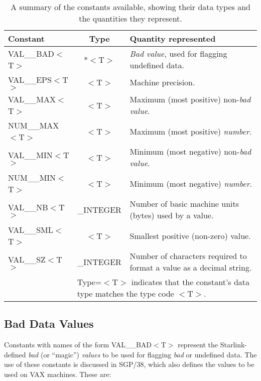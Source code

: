 \documentclass[11pt,nolof]{starlink}
\providecommand{\name}[1]{#1}
\begin{document}
\begin{table}
\begin{center}
\begin{tabular}{|l|c|p{25em}|}
\hline
\textbf{Constant} & \textbf{Type} & \textbf{Quantity represented} \\
\hline
VAL\_\_BAD$<$T$>$ & *$<$T$>$ & \emph{Bad value}, used for flagging undefined
data.
\\
VAL\_\_EPS$<$T$>$ & $<$T$>$ & Machine precision.
\\
VAL\_\_MAX$<$T$>$ & $<$T$>$ & Maximum (most positive) non-\emph{bad value}.
\\
NUM\_\_MAX$<$T$>$ & $<$T$>$ & Maximum (most positive) \emph{number}.
\\
VAL\_\_MIN$<$T$>$ & $<$T$>$ & Minimum (most negative) non-\emph{bad value}.
\\
NUM\_\_MIN$<$T$>$ & $<$T$>$ & Minimum (most negative) \emph{number}.
\\
VAL\_\_NB$<$T$>$ & \_INTEGER & Number of basic machine units (bytes) used
by a value.
\\
VAL\_\_SML$<$T$>$ & $<$T$>$ & Smallest positive (non-zero) value.
\\
VAL\_\_SZ$<$T$>$ & \_INTEGER & Number of characters required to format a
value as a decimal string.
\\
\hline
\multicolumn{1}{|c}{} &
\multicolumn{2}{l|}{\footnotesize *Type=$<$T$>$ indicates that the
constant's data type matches the type code $<$T$>$.} \\
\hline
\end{tabular}
\caption{A summary of the constants available, showing their data types and
the quantities they represent.}
\label{table:constants}
\end{center}
\end{table}

\subsection{Bad Data Values}
\label{section:badconstants}

Constants with names of the form \name{VAL\_\_BAD$<$T$>$} represent the
Starlink-defined \emph{bad} (or ``magic'') \emph{values} to be used for
flagging \emph{bad} or undefined data.
The use of these constants is discussed in SGP/38, which also defines the
values to be used on \name{VAX} machines.
These are:
\end{document}
